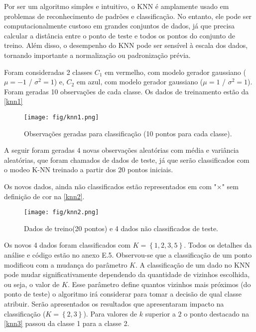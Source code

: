 \documentclass{article}
\begin{document}
  Por ser um algoritmo simples e intuitivo, o KNN é amplamente usado em problemas de reconhecimento de padrões e classificação. No entanto, ele pode ser computacionalmente custoso em grandes conjuntos de dados, já que precisa calcular a distância entre o ponto de teste e todos os pontos do conjunto de treino. Além disso, o desempenho do KNN pode ser sensível à escala dos dados, tornando importante a normalização ou padronização prévia.
 
  Foram consideradas 2 classes $C_{1}$ em vermelho, com modelo gerador gaussiano ($\mu=-1$ / $\sigma^{2}=1$) e, $C_{2}$ em azul, com modelo gerador gaussiano ($\mu=1$ / $\sigma^{2}=1$). Foram geradas 10 observações de cada classe. Os dados de treinamento estão da \autoref{knn1}
  
   \begin{figure}[ht]
   	\centering %
   	\texttt{[image: fig/knn1.png]} %
   	\caption{Observações geradas para classificação (10 pontos para cada classe).} %
   	\label{knn1} %
   \end{figure} 
    
 A seguir foram geradas $4$ novas observações aleatórias com média e variância aleatórias, que foram chamados de dados de teste, já que serão classificados com o modeo K-NN treinado a partir dos $20$ pontos iniciais. 
 
 Os novos dados, ainda não classificados estão representados em com "$ \times $" sem definição de cor na \autoref{knn2}.
 
   \begin{figure}[ht]
  	\centering %
  	\texttt{[image: fig/knn2.png]} %
  	\caption{Dados de treino(20 pontos) e 4 dados não classificados de teste.} %
  	\label{knn2} %
  \end{figure} 
  
  Os novos 4 dados foram classificados com $K = \left\{1,2,3,5\right\}$. Todos os detalhes da análise e código estão no anexo E.5. Observou-se que a classificação de um ponto modificou com a mudança do parâmetro $K$. A classificação de um dado no KNN pode mudar significativamente dependendo da quantidade de vizinhos escolhida, ou seja, o valor de $K$. Esse parâmetro define quantos vizinhos mais próximos (do ponto de teste) o algoritmo irá considerar para tomar a decisão de qual classe atribuir. Serão apresentados os resultados que apresentaram impacto na classificação ($K = \left\{2,3\right\}$). Para valores de $k$ superior a $2$ o ponto destacado na \autoref{knn3} passou da classe 1 para a classe 2.
  
\end{document}
